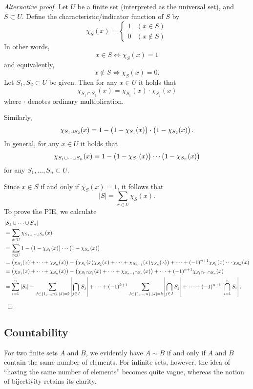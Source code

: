 \begin{proof}[Alternative proof]
Let $U$ be a finite set (interpreted as the universal set), and $S\subset U$. Define the characteristic/indicator function of $S$ by
\[ \chi_S(x)=\begin{cases}
1&(x\in S)\\
0&(x\notin S)
\end{cases} \]
In other words,
\[ x\in S\iff\chi_S(x)=1 \]
and equivalently,
\[ x\notin S\iff\chi_S(x)=0. \]
Let $S_1,S_2\subset U$ be given. Then for any $x\in U$ it holds that
\[ \chi_{S_1\cap S_2}(x)=\chi_{S_1}(x)\cdot\chi_{S_2}(x) \]
where $\cdot$ denotes ordinary multiplication.

Similarly,
\[ \chi_{S_1\cup S_2}(x)=1-\left(1-\chi_{S_1}(x)\right)\cdot\left(1-\chi_{S_2}(x)\right). \]
In general, for any $x\in U$ it holds that
\[ \chi_{S_1\cup\cdots\cup S_n}(x)=1-\left(1-\chi_{S_1}(x)\right)\cdots\left(1-\chi_{S_n}(x)\right) \]
for any $S_1,\dots,S_n\subset U$.

Since $x\in S$ if and only if $\chi_S(x)=1$, it follows that
\[ |S|=\sum_{x\in U}\chi_S(x). \]
To prove the PIE, we calculate
\begin{align*}
&|S_1\cup\cdots\cup S_n|\\
&=\sum_{x\in U}\chi_{S_1\cup\cdots\cup S_n}(x)\\
&=\sum_{x\in U}1-\left(1-\chi_{S_1}(x)\right)\cdots\left(1-\chi_{S_n}(x)\right)\\
&=\left(\chi_{S_1}(x)+\cdots+\chi_{S_n}(x)\right)-\left(\chi_{S_1}(x)\chi_{S_2}(x)+\cdots+\chi_{S_{n-1}}(x)\chi_{S_n}(x)\right)+\cdots+(-1)^{n+1}\chi_{S_1}(x)\cdots\chi_{S_n}(x)\\
&=\left(\chi_{S_1}(x)+\cdots+\chi_{S_n}(x)\right)-\left(\chi_{S_1\cap S_2}(x)+\cdots+\chi_{S_{n-1}\cap S_n}(x)\right)+\cdots+(-1)^{n+1}\chi_{S_1\cap\cdots\cap S_n}(x)\\
&=\sum_{i=1}^n|S_i|-\sum_{J\subset\{1,\dots,n\},|J|=2}\left|\bigcap_{j\in J}S_j\right|+\cdots+(-1)^{k+1}\sum_{J\subset\{1,\dots,n\},|J|=k}\left|\bigcap_{j\in J}S_j\right|+\cdots+(-1)^{n+1}\left|\bigcap_{i=1}^nS_i\right|.
\end{align*}
\end{proof}

\subsection{Countability}
For two finite sets $A$ and $B$, we evidently have $A\sim B$ if and only if $A$ and $B$ contain the same number of elements. For infinite sets, however, the idea of ``having the same number of elements'' becomes quite vague, whereas the notion of bijectivity retains its clarity.

